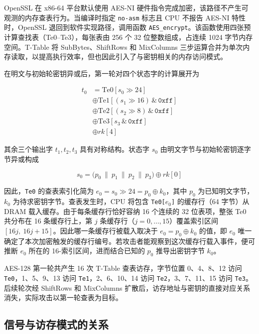 OpenSSL 在 x86-64 平台默认使用 AES-NI 硬件指令完成加密，该路径不产生可观测的内存查表行为。当编译时指定 \texttt{no-asm} 标志且 CPU 不报告 AES-NI 特性时，OpenSSL 退回到软件实现路径，调用函数 \texttt{AES\_encrypt}。该函数使用四张预计算查找表（Te0--Te3），每张表由 256 个 32 位整数组成，占连续 1024 字节内存空间。T-Table 将 SubBytes、ShiftRows 和 MixColumns 三步运算合并为单次内存读取，以提高执行效率，但也因此引入了与密钥相关的内存访问模式。

在明文与初始轮密钥异或后，第一轮对四个状态字的计算展开为

\begin{equation}
  \begin{aligned}
    t_0 &= \mathrm{Te0}[s_0 \gg 24] \\
    &\oplus \mathrm{Te1}[(s_1 \gg 16)\,\&\,\mathtt{0xff}] \\
    &\oplus \mathrm{Te2}[(s_2 \gg 8)\,\&\,\mathtt{0xff}] \\
    &\oplus \mathrm{Te3}[s_3\,\&\,\mathtt{0xff}] \\
    &\oplus \mathit{rk}[4]
  \end{aligned}
  \label{eq:aes_round1}
\end{equation}

其余三个输出字 $t_1, t_2, t_3$ 具有对称结构。状态字 $s_0$ 由明文字节与初始轮密钥逐字节异或构成

\begin{equation}
  s_0 = \bigl(p_0 \ \| \ p_1 \ \| \ p_2 \ \| \ p_3\bigr) \oplus \mathit{rk}[0]
  \label{eq:state_word}
\end{equation}

因此，\texttt{Te0} 的查表索引化简为 $e_0 = s_0 \gg 24 = p_0 \oplus k_0$，其中 $p_0$ 为已知明文字节，$k_0$ 为待求密钥字节。查表发生时，CPU 将包含 \texttt{Te0[$e_0$]} 的缓存行（64 字节）从 DRAM 载入缓存。由于每条缓存行恰好容纳 16 个连续的 32 位表项，整张 Te0 共分布在 16 条缓存行上，第 $j$ 条缓存行（$j = 0, \ldots, 15$）覆盖索引区间 $[16j,\ 16j+15]$。因此哪一条缓存行被载入取决于 $e_0 = p_0 \oplus k_0$ 的值，即 $e_0$ 唯一确定了本次加密触发的缓存行编号。若攻击者能观察到这次缓存行载入事件，便可推断 $e_0$ 所在的 16-索引区间，进而结合已知的 $p_0$ 推导出密钥字节 $k_0$。

AES-128 第一轮共产生 16 次 T-Table 查表访存，字节位置 0、4、8、12 访问 \texttt{Te0}，1、5、9、13 访问 \texttt{Te1}，2、6、10、14 访问 \texttt{Te2}，3、7、11、15 访问 \texttt{Te3}。后续轮次经 ShiftRows 和 MixColumns 扩散后，访存地址与密钥的直接对应关系消失，实际攻击以第一轮查表为目标。

\subsection{信号与访存模式的关系}


